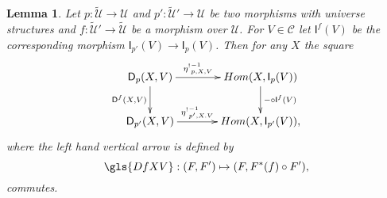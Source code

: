 \documentclass[12pt]{article}
\numberwithin{equation}{section}
\newtheorem{lemma}[proposition]{Lemma}
\newcommand{\sr}{\rightarrow}
\newcommand{\wt}{\widetilde}
\newcommand{\C}{{\mathcal C}}  %
\newcommand{\U}{\mathcal{U}}
\newcommand{\D}{\mathsf{D}}
\newcommand{\I}{\mathsf{I}}
\newcommand{\etashriek}{\eta^!}
\newcommand{\etaunshriek}{{\etashriek}^{-1}}
\begin{document}
%
%
\begin{lemma}
\label{2015.04.02.l4} Let $p:\wt{\U}\sr \U$ and $p':\wt{\U}'\sr \U$ be two
morphisms with universe structures and $f:\wt{\U}'\sr \wt{\U}$ be a morphism over
$\U$. For $V\in {\C}$ let $\I^f(V)$ be the corresponding morphism
$\I_{p'}(V)\sr \I_p(V)$. Then for any $X$ the square
%
$$
\begin{xy}
          \xymatrix@C=3pc{ \D_p(X,V) \ar[r]^-{\etaunshriek_{p,X,V}} \ar[d]_{\D^f(X,V)} &
            Hom(X, \I_p(V)) \ar[d]^{-\circ \I^f(V)}\\ \D_{p'}(X,V)
            \ar[r]^-{\etaunshriek_{p',X.V}} & Hom (X, \I_{p'}(V)), }
\end{xy}
$$
%
where the left hand vertical arrow is defined by
%
$$\gls{DfXV}:(F, F')\mapsto (F,F^*(f)\circ F'),$$
%
commutes.
\end{lemma}
%
\end{document}
